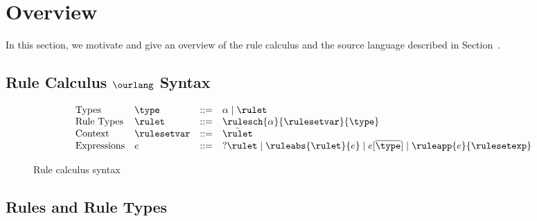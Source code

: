 \visiblecomments

\newlength{\blanklineskip}
\setlength{\blanklineskip}{0.66084ex}

\newcommand{\hsindent}[1]{\quad}%
\let\hspre\empty
\let\hspost\empty
\newcommand{\NB}{\textbf{NB}}
\newcommand{\Todo}[1]{$\langle$\textbf{To do:}~#1$\rangle$}

\EndFmtInput
\makeatother
%

\section{Overview} %
\label{sec:overview}

In this section, we motivate and give an overview of the rule calculus and the
source language described in Section~\cite{}. 


\subsection{Rule Calculus $\ourlang$ Syntax}

\begin{figure}

\begin{center}
  
  \[ \begin{array}{llrl}
    \text{Types} & \type  & ::=  & \alpha \mid \rulet \\
    \text{Rule Types} & \rulet  & ::= & 
    \rulesch{\alpha}{\rulesetvar}{\type} \\
    \text{Context} & \rulesetvar  & ::= & \bar{\rulet} \\
    \text{Expressions} & e & ::=  & 
    ?\rulet \mid 
    \ruleabs{\rulet}{e} \mid
    e[\overline{\type}] \mid
    \ruleapp{e}{\rulesetexp} \\
  \end{array} \]
\end{center}

\caption{Rule calculus syntax}

\end{figure}

\subsection{Rules and Rule Types}


